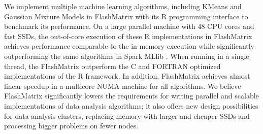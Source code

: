 
We implement multiple machine learning algorithms, including KMeans \cite{kmeans}
and Gaussian Mixture Models \cite{gmm} in FlashMatrix with its R programming
interface to benchmark its performance. On a large parallel machine with 48
CPU cores and fast SSDs, the out-of-core execution of these R implementations
in FlashMatrix achieves performance comparable to the in-memory execution
while significantly outperforming the same algorithms in Spark MLlib \cite{spark}.
When running in a single thread, the FlashMatrix outperform the C and
FORTRAN optimized implementations of the R framework. In addition, FlashMatrix achieves
almost linear speedup in a multicore NUMA machine for all algorithms.
We believe FlashMatrix significantly lowers the requirements for writing parallel
and scalable implementations of data analysis algorithms; it also offers new
design possibilities for data analysis clusters, replacing memory with larger
and cheaper SSDs and processing bigger problems on fewer nodes.
